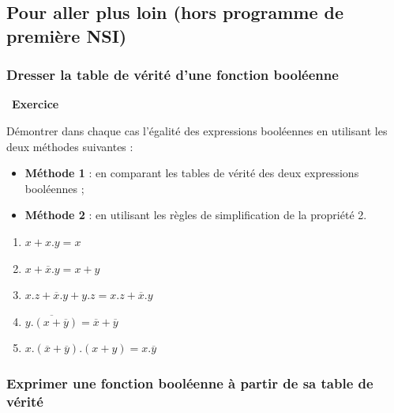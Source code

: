 \documentclass[
  11pt,
]{article}
\providecommand{\tightlist}{%
  \setlength{\itemsep}{0pt}\setlength{\parskip}{0pt}}
\newcounter{exo}
\newenvironment{exercice}[1]
{\par \medskip   \addtocounter{exo}{1} \noindent  
\begin{bclogo}[arrondi =0.1,   noborder = true, logo=\bccrayon, marge=4]{~\textbf{Exercice} \textbf{\theexo} {\itshape #1} }  \par}
{
\end{bclogo}
 \par \bigskip }
\newcounter{prop}
\newcounter{def}
\newcounter{prog}
\begin{document}
\hypertarget{pour-aller-plus-loin-hors-programme-de-premiuxe8re-nsi}{%
\subsection{Pour aller plus loin (hors programme de première
NSI)}\label{pour-aller-plus-loin-hors-programme-de-premiuxe8re-nsi}}

\hypertarget{dresser-la-table-de-vuxe9rituxe9-dune-fonction-booluxe9enne}{%
\subsubsection{Dresser la table de vérité d'une fonction
booléenne}\label{dresser-la-table-de-vuxe9rituxe9-dune-fonction-booluxe9enne}}

\begin{exercice}{}

Démontrer dans chaque cas l'égalité des expressions booléennes en
utilisant les deux méthodes suivantes :

\begin{itemize}
\item
  \textbf{Méthode 1} : en comparant les tables de vérité des deux
  expressions booléennes ;
\item
  \textbf{Méthode 2} : en utilisant les règles de simplification de la
  propriété 2.
\end{itemize}

\begin{enumerate}
\def\labelenumi{\arabic{enumi}.}
\tightlist
\item
  \(x + x . y = x\)
\item
  \(x + \overline{x} . y= x + y\)
\item
  \(x . z + \overline{x} . y + y . z = x . z + \overline{x} . y\)
\item
  \(\overline{y . (x + \overline{y})} = \overline{x} + \overline{y}\)
\item
  \(x . ( \overline{x} + \overline{y}) . (x + y) = x . \overline{y}\)
\end{enumerate}

\end{exercice}

\hypertarget{exprimer-une-fonction-booluxe9enne-uxe0-partir-de-sa-table-de-vuxe9rituxe9}{%
\subsubsection{Exprimer une fonction booléenne à partir de sa table de
vérité}\label{exprimer-une-fonction-booluxe9enne-uxe0-partir-de-sa-table-de-vuxe9rituxe9}}
\end{document}
